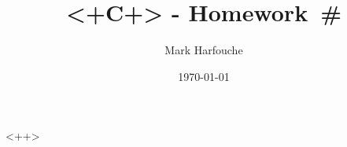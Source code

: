 \documentclass[letterpaper]{article}
\author{Mark Harfouche}
\date{\today}
\title{<+C+> - Homework~\#<++>}
\begin{document}
\maketitle


<++>
\end{document}
